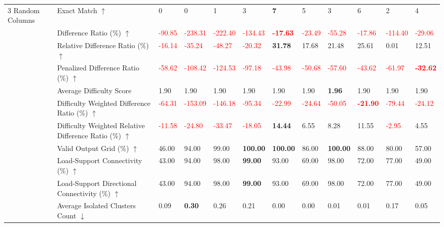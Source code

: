 \begin{table}[!h]
{\begin{tabular}{llllllllllll}
3 Random Columns & Exact Match $\uparrow$ & 0 & 0 & 1 & 3 & \textbf{7} & 5 & 3 & 6 & 2 & 4 \\
 & Difference Ratio (\%) $\uparrow$ & \textcolor{red}{-90.85} & \textcolor{red}{-238.31} & \textcolor{red}{-222.40} & \textcolor{red}{-134.43} & \textbf{\textcolor{red}{-17.63}} & \textcolor{red}{-23.49} & \textcolor{red}{-55.28} & \textcolor{red}{-17.86} & \textcolor{red}{-114.40} & \textcolor{red}{-29.06} \\
 & Relative Difference Ratio (\%) $\uparrow$ & \textcolor{red}{-16.14} & \textcolor{red}{-35.24} & \textcolor{red}{-48.27} & \textcolor{red}{-20.32} & \textbf{31.78} & 17.68 & 21.48 & 25.61 & 0.01 & 12.51 \\
 & Penalized Difference Ratio (\%) $\uparrow$ & \textcolor{red}{-58.62} & \textcolor{red}{-108.42} & \textcolor{red}{-124.53} & \textcolor{red}{-97.18} & \textcolor{red}{-43.98} & \textcolor{red}{-50.68} & \textcolor{red}{-57.60} & \textcolor{red}{-43.62} & \textcolor{red}{-61.97} & \textbf{\textcolor{red}{-32.62}} \\
 & Average Difficulty Score & 1.90 & 1.90 & 1.90 & 1.90 & 1.90 & 1.90 & \textbf{1.96} & 1.90 & 1.90 & 1.90 \\
 & Difficulty Weighted Difference Ratio (\%) $\uparrow$ & \textcolor{red}{-64.31} & \textcolor{red}{-153.09} & \textcolor{red}{-146.18} & \textcolor{red}{-95.34} & \textcolor{red}{-22.99} & \textcolor{red}{-24.64} & \textcolor{red}{-50.05} & \textbf{\textcolor{red}{-21.90}} & \textcolor{red}{-79.44} & \textcolor{red}{-24.12} \\
 & Difficulty Weighted Relative Difference Ratio (\%) $\uparrow$ & \textcolor{red}{-11.58} & \textcolor{red}{-24.80} & \textcolor{red}{-33.47} & \textcolor{red}{-18.05} & \textbf{14.44} & 6.55 & 8.28 & 11.55 & \textcolor{red}{-2.95} & 4.55 \\
 & Valid Output Grid (\%) $\uparrow$ & 46.00 & 94.00 & 99.00 & \textbf{100.00} & \textbf{100.00} & 86.00 & \textbf{100.00} & 88.00 & 80.00 & 57.00 \\
 & Load-Support Connectivity (\%) $\uparrow$ & 43.00 & 94.00 & 98.00 & \textbf{99.00} & 93.00 & 69.00 & 98.00 & 72.00 & 77.00 & 49.00 \\
 & Load-Support Directional Connectivity (\%) $\uparrow$ & 43.00 & 94.00 & 98.00 & \textbf{99.00} & 93.00 & 69.00 & 98.00 & 72.00 & 77.00 & 49.00 \\
 & Average Isolated Clusters Count $\downarrow$ & 0.09 & \textbf{0.30} & 0.26 & 0.21 & 0.00 & 0.00 & 0.01 & 0.01 & 0.17 & 0.05 \\

\end{tabular}}
\end{table}
